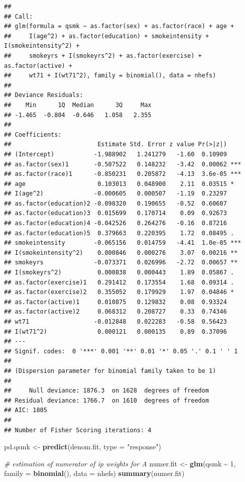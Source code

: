 \documentclass[
  10pt,
]{book}
\newenvironment{Shaded}{\begin{snugshade}}{\end{snugshade}}
\newcommand{\CommentTok}[1]{\textcolor[rgb]{0.56,0.35,0.01}{\textit{#1}}}
\newcommand{\DataTypeTok}[1]{\textcolor[rgb]{0.13,0.29,0.53}{#1}}
\newcommand{\DecValTok}[1]{\textcolor[rgb]{0.00,0.00,0.81}{#1}}
\newcommand{\KeywordTok}[1]{\textcolor[rgb]{0.13,0.29,0.53}{\textbf{#1}}}
\newcommand{\NormalTok}[1]{#1}
\newcommand{\OperatorTok}[1]{\textcolor[rgb]{0.81,0.36,0.00}{\textbf{#1}}}
\newcommand{\StringTok}[1]{\textcolor[rgb]{0.31,0.60,0.02}{#1}}
\begin{document}
\begin{verbatim}
## 
## Call:
## glm(formula = qsmk ~ as.factor(sex) + as.factor(race) + age + 
##     I(age^2) + as.factor(education) + smokeintensity + I(smokeintensity^2) + 
##     smokeyrs + I(smokeyrs^2) + as.factor(exercise) + as.factor(active) + 
##     wt71 + I(wt71^2), family = binomial(), data = nhefs)
## 
## Deviance Residuals: 
##    Min      1Q  Median      3Q     Max  
## -1.465  -0.804  -0.646   1.058   2.355  
## 
## Coefficients:
##                        Estimate Std. Error z value Pr(>|z|)    
## (Intercept)           -1.988902   1.241279   -1.60  0.10909    
## as.factor(sex)1       -0.507522   0.148232   -3.42  0.00062 ***
## as.factor(race)1      -0.850231   0.205872   -4.13  3.6e-05 ***
## age                    0.103013   0.048900    2.11  0.03515 *  
## I(age^2)              -0.000605   0.000507   -1.19  0.23297    
## as.factor(education)2 -0.098320   0.190655   -0.52  0.60607    
## as.factor(education)3  0.015699   0.170714    0.09  0.92673    
## as.factor(education)4 -0.042526   0.264276   -0.16  0.87216    
## as.factor(education)5  0.379663   0.220395    1.72  0.08495 .  
## smokeintensity        -0.065156   0.014759   -4.41  1.0e-05 ***
## I(smokeintensity^2)    0.000846   0.000276    3.07  0.00216 ** 
## smokeyrs              -0.073371   0.026996   -2.72  0.00657 ** 
## I(smokeyrs^2)          0.000838   0.000443    1.89  0.05867 .  
## as.factor(exercise)1   0.291412   0.173554    1.68  0.09314 .  
## as.factor(exercise)2   0.355052   0.179929    1.97  0.04846 *  
## as.factor(active)1     0.010875   0.129832    0.08  0.93324    
## as.factor(active)2     0.068312   0.208727    0.33  0.74346    
## wt71                  -0.012848   0.022283   -0.58  0.56423    
## I(wt71^2)              0.000121   0.000135    0.89  0.37096    
## ---
## Signif. codes:  0 '***' 0.001 '**' 0.01 '*' 0.05 '.' 0.1 ' ' 1
## 
## (Dispersion parameter for binomial family taken to be 1)
## 
##     Null deviance: 1876.3  on 1628  degrees of freedom
## Residual deviance: 1766.7  on 1610  degrees of freedom
## AIC: 1805
## 
## Number of Fisher Scoring iterations: 4
\end{verbatim}

\begin{Shaded}
\begin{Highlighting}[]
\NormalTok{pd.qsmk \textless{}{-}}\StringTok{ }\KeywordTok{predict}\NormalTok{(denom.fit, }\DataTypeTok{type =} \StringTok{"response"}\NormalTok{)}

\CommentTok{\# estimation of numerator of ip weights for A}
\NormalTok{numer.fit \textless{}{-}}\StringTok{ }\KeywordTok{glm}\NormalTok{(qsmk }\OperatorTok{\textasciitilde{}}\StringTok{ }\DecValTok{1}\NormalTok{, }\DataTypeTok{family =} \KeywordTok{binomial}\NormalTok{(), }\DataTypeTok{data =}\NormalTok{ nhefs)}
\KeywordTok{summary}\NormalTok{(numer.fit)}
\end{Highlighting}
\end{Shaded}
\end{document}

